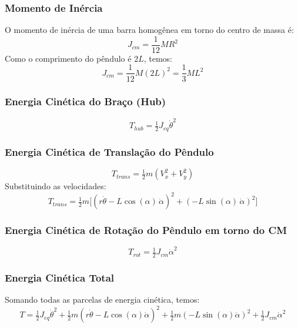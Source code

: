 \documentclass[9pt,a4paper,twocolumn,twoside]{tau-class/tau}
\begin{document}
\subsubsection*{Momento de Inércia}
O momento de inércia de uma barra homogênea em torno do centro de massa é:
\begin{equation}
    J_{cm} = \frac{1}{12} M R^2
\end{equation}
Como o comprimento do pêndulo é $2L$, temos:
\begin{equation}
    J_{cm} = \frac{1}{12} M (2L)^2 = \frac{1}{3} M L^2
\end{equation}

\subsubsection*{Energia Cinética do Braço (Hub)}
\begin{equation}
    T_{hub} = \tfrac{1}{2} J_{eq} \dot{\theta}^2
\end{equation}

\subsubsection*{Energia Cinética de Translação do Pêndulo}
\begin{equation}
    T_{trans} = \tfrac{1}{2} m (V_x^2 + V_y^2)
\end{equation}
Substituindo as velocidades:
\begin{equation}
    T_{trans} = \tfrac{1}{2} m \Big[ (r \dot{\theta} - L \cos(\alpha) \, \dot{\alpha})^2 + (-L \sin(\alpha) \, \dot{\alpha})^2 \Big]
\end{equation}

\subsubsection*{Energia Cinética de Rotação do Pêndulo em torno do CM}
\begin{equation}
    T_{rot} = \tfrac{1}{2} J_{cm} \dot{\alpha}^2
\end{equation}

\subsubsection*{Energia Cinética Total}

Somando todas as parcelas de energia cinética, temos:
\begin{equation}
    T = \tfrac{1}{2} J_{eq} \dot{\theta}^2 
        + \tfrac{1}{2} m (r \dot{\theta} - L \cos(\alpha) \dot{\alpha})^2
        + \tfrac{1}{2} m (-L \sin(\alpha) \dot{\alpha})^2
        + \tfrac{1}{2} J_{cm} \dot{\alpha}^2
    \label{eq:Ttotal1}
\end{equation}
\end{document}
